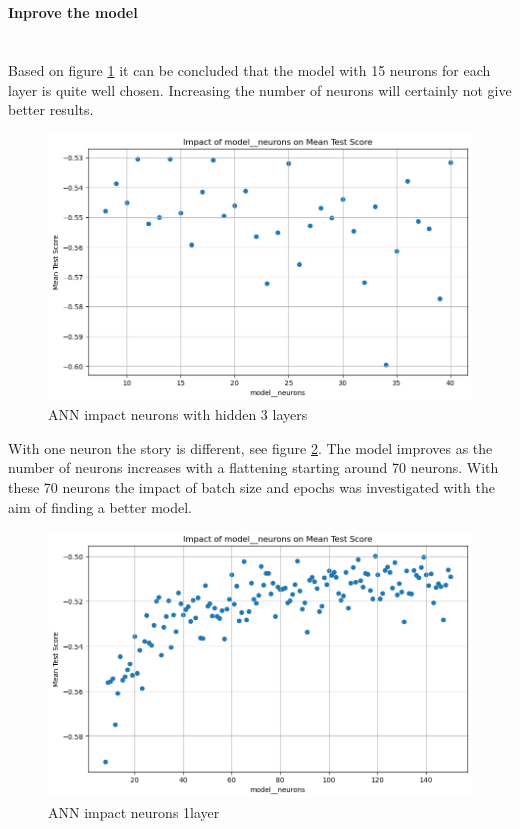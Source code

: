 \documentclass{article}
\newcommand{\subsubsubsection}[1]{%
  \paragraph{#1}\mbox{}\\}
\begin{document}
\subsubsubsection{Inprove the model}
Based on figure \ref{fig:ANN-impact-neurons-3layers} it can be concluded that the model with 15 neurons for each layer is quite well chosen. Increasing the number of neurons will certainly not give better results.

\begin{figure}
	\centering
	\includegraphics[width=\linewidth]{figures/ANN_impact_neurons_3layers.png}
	\caption{ANN impact neurons with hidden 3 layers}
	\label{fig:ANN-impact-neurons-3layers}
\end{figure}

With one neuron the story is different, see figure \ref{fig:ANN-impact-neurons-1layer}. The model improves as the number of neurons increases with a flattening starting around 70 neurons. With these 70 neurons the impact of batch size and epochs was investigated with the aim of finding a better model.

\begin{figure}
	\centering
	\includegraphics[width=\linewidth]{figures/ANN_impact_neurons_1layer.png}
	\caption{ANN impact neurons 1layer}
	\label{fig:ANN-impact-neurons-1layer}
\end{figure}
\end{document}
